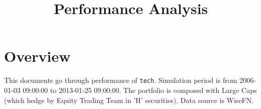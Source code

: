 \documentclass{article}
\begin{document}




\title{Performance Analysis}
\author{}
\date{}

\maketitle


\section{Overview}
This documents go through performance of \verb|tech|. Simulation period is from 2006-01-03 09:00:00 to 2013-01-25 09:00:00. The portfolio is composed with Large Caps (which hedge by Equity Trading Team in 'H' securities). Data source is WiseFN.
\end{document}
